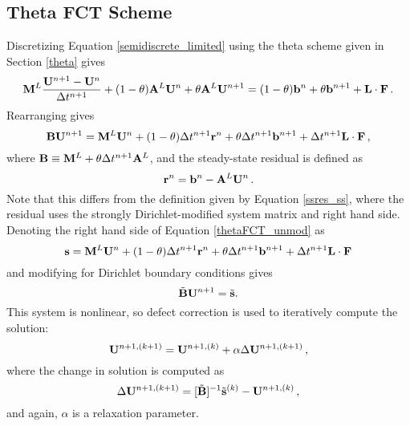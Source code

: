 \subsection{Theta FCT Scheme}
Discretizing Equation \eqref{semidiscrete_limited} using the theta scheme
given in Section \ref{theta} gives
\begin{equation}
   \mathbf{M}^L\frac{\mathbf{U}^{n+1}-\mathbf{U}^n}{\Delta t^{n+1}} + (1-\theta)\mathbf{A}^L\mathbf{U}^{n}
   + \theta\mathbf{A}^L\mathbf{U}^{n+1} = (1-\theta)\mathbf{b}^n + \theta\mathbf{b}^{n+1}
   + \mathbf{L}\cdot\mathbf{F} \,.
\end{equation}
Rearranging gives
\begin{equation}\label{thetaFCT_unmod}
   \mathbf{B}\mathbf{U}^{n+1} = \mathbf{M}^L\mathbf{U}^n + (1-\theta)\Delta t^{n+1}\mathbf{r}^n + \theta\Delta t^{n+1}\mathbf{b}^{n+1}
   + \Delta t^{n+1}\mathbf{L}\cdot\mathbf{F} \,,
\end{equation}
where $\mathbf{B}\equiv \mathbf{M}^L + \theta\Delta t^{n+1}\mathbf{A}^L$, and the steady-state residual
is defined as
\begin{equation}
   \mathbf{r}^n = \mathbf{b}^n - \mathbf{A}^L\mathbf{U}^n \,.
\end{equation}
Note that this differs from the definition given by Equation \eqref{ssres_ss},
where the residual uses the strongly Dirichlet-modified system matrix and right
hand side. Denoting the right hand side of Equation \eqref{thetaFCT_unmod} as
\begin{equation}
   \mathbf{s} = \mathbf{M}^L\mathbf{U}^n + (1-\theta)\Delta t^{n+1}\mathbf{r}^n + \theta\Delta t^{n+1}\mathbf{b}^{n+1} + \Delta t^{n+1}\mathbf{L}\cdot\mathbf{F}
\end{equation}
and modifying for Dirichlet boundary conditions gives
\begin{equation}
   \tilde{\mathbf{B}}\mathbf{U}^{n+1} = \tilde{\mathbf{s}}.
\end{equation}
This system is nonlinear, so defect correction is used to iteratively
compute the solution:
\begin{equation}
   \mathbf{U}^{n+1,(k+1)} = \mathbf{U}^{n+1,(k)} + \alpha\Delta\mathbf{U}^{n+1,(k+1)} \,,
\end{equation}
where the change in solution is computed as
\begin{equation}
   \Delta\mathbf{U}^{n+1,(k+1)} = [\tilde{\mathbf{B}}]^{-1}\tilde{\mathbf{s}}^{(k)} - \mathbf{U}^{n+1,(k)} \,,
\end{equation}
and again, $\alpha$ is a relaxation parameter.


